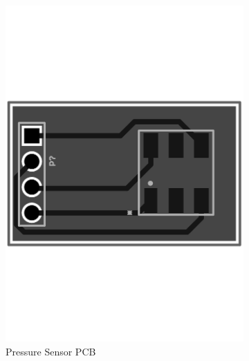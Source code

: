 \documentclass[11pt,a4paper]{article}
\begin{document}
\begin{figure}[!hbt]
    \centering
    \begin{subfigure}[t]{0.45 \textwidth}
        \centering
        \includegraphics[angle=270, origin=c, clip, trim=0cm 0cm 0cm 0cm, width=1.00\textwidth]{PressureSensorPCB.pdf}
        \caption{Pressure Sensor PCB}
        \label{fig:pres_sense_pcb}
    \end{subfigure}
    \begin{subfigure}[t]{0.45 \textwidth}
        \centering

\end{subfigure}
\end{figure}
\end{document}
